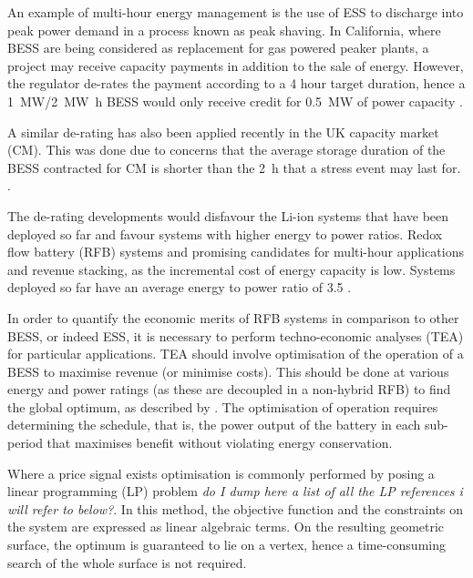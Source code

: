 \documentclass[preprint,3p,review,authoryear,10pt]{elsarticle}
\begin{document}
An example of multi-hour energy management is the use of ESS to discharge into peak power demand in a process known as peak shaving. In California, where BESS are being considered as replacement for gas powered peaker plants, a project may receive capacity payments in addition to the sale of energy. However, the regulator de-rates the payment according to a 4 hour target duration, hence a \SI{1}{\mega\watt}/\SI{2}{\mega\watt\hour} BESS would only receive credit for  \SI{0.5}{\mega\watt} of power capacity \cite{NRELPeakingESS}. 

A similar de-rating has also been applied recently in the UK capacity market (CM). This was done due to concerns that the average storage duration of the BESS contracted for CM is shorter than the \SI{2}{\hour} that a stress event may last for. \cite{NGDeratingFactors}. 

The de-rating developments would disfavour the Li-ion systems that have been deployed so far and favour systems with higher energy to power ratios. Redox flow battery (RFB) systems and promising candidates for multi-hour applications and revenue stacking, as the incremental cost of energy capacity is low. Systems deployed so far have an average energy to power ratio of 3.5 \cite{Newbery2018}.

In order to quantify the economic merits of RFB systems in comparison to other BESS, or indeed ESS, it is necessary to perform techno-economic analyses (TEA) for particular applications. TEA should involve optimisation of the operation of a BESS to maximise revenue (or minimise costs). This should be done at various energy and power ratings (as these are decoupled in a non-hybrid RFB) to find the global optimum, as described by \cite{Oudalov2007}. The optimisation of operation requires determining the schedule, that is, the power output of the battery in each sub-period that maximises benefit without violating energy conservation.

Where a price signal exists optimisation is commonly performed by posing a linear programming (LP) problem \emph{do I dump here a list of all the LP references i will refer to below?}. In this method, the objective function and the constraints on the system are expressed as linear algebraic terms. On the resulting geometric surface, the optimum is guaranteed to lie on a vertex, hence a time-consuming search of the whole surface is not required.
\end{document}

